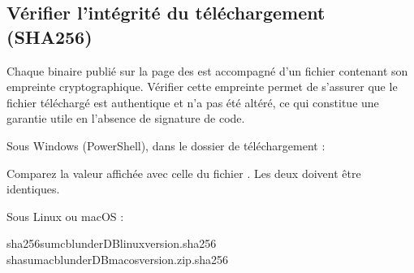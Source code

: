 \documentclass[letterpaper,10pt,french]{sphinxmanual}
\begin{document}
\begin{figure}[htbp]
\centering

\noindent{}
\end{figure}

\begin{figure}[htbp]
\centering

\noindent{}
\end{figure}

\begin{figure}[htbp]
\centering

\noindent{}
\end{figure}


\subsection{Vérifier l’intégrité du téléchargement (SHA256)}
\label{\detokenize{annexe_windows_securite:verifier-l-integrite-du-telechargement-sha256}}
\sphinxAtStartPar
Chaque binaire publié sur la page des  est accompagné d’un fichier
 contenant son empreinte cryptographique. Vérifier cette empreinte
permet de s’assurer que le fichier téléchargé est authentique et n’a pas été
altéré, ce qui constitue une garantie utile en l’absence de signature de code.

\sphinxAtStartPar
Sous Windows (PowerShell), dans le dossier de téléchargement :

\begin{sphinxVerbatim}[commandchars=\\\{\}]
   
\end{sphinxVerbatim}

\sphinxAtStartPar
Comparez la valeur affichée avec celle du fichier
. Les deux doivent être identiques.

\sphinxAtStartPar
Sous Linux ou macOS :

\begin{sphinxVerbatim}[commandchars=\\\{\}]
sha256sum\PYGZhy{}cblunderDB\PYGZhy{}linux\PYGZhy{}\PYGZlt{}version\PYGZgt{}.sha256
shasum\PYGZhy{}a\PYGZhy{}cblunderDB\PYGZhy{}macos\PYGZhy{}\PYGZlt{}version\PYGZgt{}.zip.sha256
\end{sphinxVerbatim}
\end{document}
